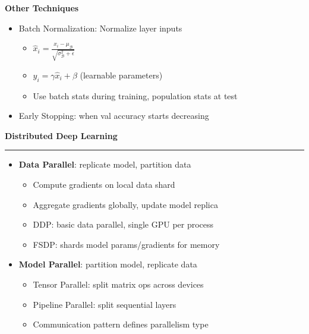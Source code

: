 \documentclass[8pt,letter,landscape]{article}
\newcommand{\sectiontitle}[1]{\textbf{\large #1}\vspace{0.2em}\hrule\vspace{0.5em}}
\begin{document}
\begin{multicols*}{3}
\textbf{Other Techniques}
\begin{itemize}[leftmargin=*,noitemsep,topsep=0pt]
\item Batch Normalization: Normalize layer inputs
    \begin{itemize}[leftmargin=*,nosep]
        \item $\hat{x}_i = \frac{x_i - \mu_\mathcal{B}}{\sqrt{\sigma^2_\mathcal{B} + \epsilon}}$
        \item $y_i = \gamma\hat{x}_i + \beta$ (learnable parameters)
        \item Use batch stats during training, population stats at test
    \end{itemize}
    \item Early Stopping: when val accuracy starts decreasing
\end{itemize}

\sectiontitle{Distributed Deep Learning}
\begin{itemize}[leftmargin=*,nosep]
    \item \textbf{Data Parallel}: replicate model, partition data
    \begin{itemize}[leftmargin=*,nosep]
        \item Compute gradients on local data shard
        \item Aggregate gradients globally, update model replica
        \item DDP: basic data parallel, single GPU per process
        \item FSDP: shards model params/gradients for memory
    \end{itemize}
    
    \item \textbf{Model Parallel}: partition model, replicate data
    \begin{itemize}[leftmargin=*,nosep]
        \item Tensor Parallel: split matrix ops across devices
        \item Pipeline Parallel: split sequential layers
        \item Communication pattern defines parallelism type
    \end{itemize}


\end{itemize}
\end{multicols*}
\end{document}
